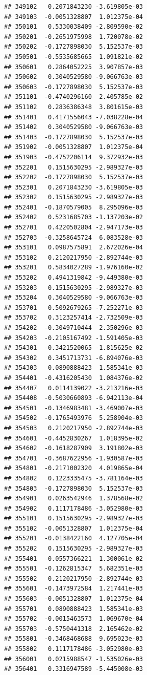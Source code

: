 \documentclass[ignorenonframetext,]{beamer}
\begin{document}
\begin{frame}[fragile]
\begin{verbatim}
## 349102   0.2071843230 -3.619805e-03
## 349103  -0.0051328807  1.012375e-04
## 350101   0.5330038409 -2.809590e-02
## 350201  -0.2651975998  1.720078e-02
## 350202  -0.1727898030  5.152537e-03
## 350501  -0.5535685665  1.091821e-02
## 350601   0.2864052225  3.907857e-03
## 350602   0.3040529580 -9.066763e-03
## 350603  -0.1727898030  5.152537e-03
## 351101  -0.4740296160  2.405785e-02
## 351102   0.2836386348  3.801615e-03
## 351401   0.4171556043 -7.038228e-04
## 351402   0.3040529580 -9.066763e-03
## 351403  -0.1727898030  5.152537e-03
## 351902  -0.0051328807  1.012375e-04
## 351903  -0.4752206114  9.372932e-03
## 352201   0.1515630295 -2.989327e-03
## 352202  -0.1727898030  5.152537e-03
## 352301   0.2071843230 -3.619805e-03
## 352302   0.1515630295 -2.989327e-03
## 352401  -0.1870579005  8.295096e-03
## 352402   0.5231685703 -1.137203e-02
## 352701   0.4220502804 -2.947173e-03
## 352703  -0.3258645724  6.083528e-03
## 353101   0.0987575891  2.672026e-04
## 353102   0.2120217950 -2.892744e-03
## 353201   0.5834027289 -1.976160e-02
## 353202   0.4941319842 -9.449380e-03
## 353203   0.1515630295 -2.989327e-03
## 353204   0.3040529580 -9.066763e-03
## 353701   0.5092679265 -7.252271e-03
## 353702   0.3123257414 -2.732509e-03
## 354202  -0.3049710444  2.350296e-03
## 354203  -0.2105167492 -1.591405e-03
## 354301  -0.3421520065 -1.815625e-02
## 354302   0.3451713731 -6.894076e-03
## 354303   0.0890888423  1.585341e-03
## 354401  -0.4316205430  1.084376e-02
## 354407   0.0114139022 -3.213216e-03
## 354408  -0.5030660893 -6.942113e-04
## 354501  -0.1346983481 -3.469007e-03
## 354502  -0.1765493976  5.258904e-03
## 354503   0.2120217950 -2.892744e-03
## 354601  -0.4452830267  1.018395e-02
## 354602  -0.1618287909  3.191802e-03
## 354701  -0.3687622956 -1.930587e-03
## 354801  -0.2171002320  4.019865e-04
## 354802   0.1223335475 -3.781164e-03
## 354803  -0.1727898030  5.152537e-03
## 354901   0.0263542946  1.378568e-02
## 354902   0.1117178486 -3.052980e-03
## 355101   0.1515630295 -2.989327e-03
## 355102  -0.0051328807  1.012375e-04
## 355201  -0.0138422160  4.127705e-04
## 355202   0.1515630295 -2.989327e-03
## 355401  -0.0557366221  1.300061e-02
## 355501  -0.1262815347  5.682351e-03
## 355502   0.2120217950 -2.892744e-03
## 355601  -0.1473972584  1.217441e-03
## 355603  -0.0051328807  1.012375e-04
## 355701   0.0890888423  1.585341e-03
## 355702  -0.0015463573  1.069670e-04
## 355703  -0.5750441318  2.165462e-02
## 355801  -0.3468468688  9.695023e-03
## 355802   0.1117178486 -3.052980e-03
## 356001   0.0215988547 -1.535026e-03
## 356401   0.3316947589 -5.445008e-03

\end{verbatim}
\end{frame}
\end{document}
